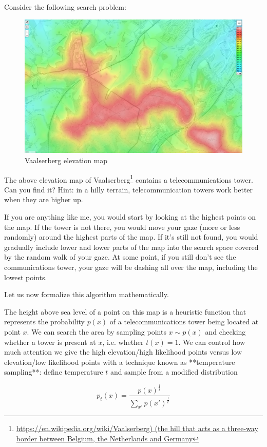 Consider the following search problem:

\begin{figure}
    \centering
    \includegraphics[width=0.8\linewidth]{images/vaalserberg_lost.png}
    \caption{Vaalserberg elevation map}
\end{figure}


The above elevation map of Vaalserberg\footnote{\url{https://en.wikipedia.org/wiki/Vaalserberg) (the hill that acts as a three-way border between Belgium, the Netherlands and Germany}} contains a telecommunications tower. Can you find it? Hint: in a hilly terrain, telecommunication towers work better when they are higher up.

If you are anything like me, you would start by looking at the highest points on the map.
If the tower is not there, you would move your gaze (more or less randomly) around the highest parts of the map.
If it's still not found, you would gradually include lower and lower parts of the map into the search space covered by the random walk of your gaze.
At some point, if you still don't see the communications tower, your gaze will be dashing all over the map, including the lowest points.

Let us now formalize this algorithm mathematically.

The height above sea level of a point on this map is a heuristic function that represents the probability $p(x)$ of a telecommunications tower being located at point $x$.
We can search the area by sampling points $x \sim p(x)$ and checking whether a tower is present at $x$, i.e. whether $t(x)=1$.
We can control how much attention we give the high elevation/high likelihood points versus low elevation/low likelihood points with a technique known as **temperature sampling**: define temperature $t$ and sample from a modified distribution

\begin{equation}
p_t(x) = \frac{p(x)^{\frac{1}{t}}}{\sum_{x'} p(x')^{\frac{1}{t}}}
\end{equation}

